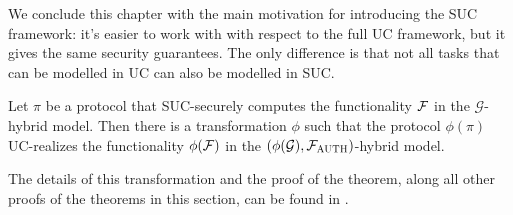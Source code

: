 We conclude this chapter with the main motivation for introducing the SUC framework: it's easier to work with with respect to the full UC framework, but it gives the same security guarantees. The only difference is that not all tasks that can be modelled in UC can also be modelled in SUC.

\begin{theorem}
    Let $\pi$ be a protocol that SUC-securely computes the functionality $\mathcal{F}$ in the $\mathcal G$-hybrid model. Then there is a transformation $\phi$ such that the protocol $\phi(\pi)$ UC-realizes the functionality $\phi(\mathcal{F})$ in the $(\phi(\mathcal G), \mathcal{F}_{\textsc{AUTH}})$-hybrid model.
\end{theorem}

The details of this transformation and the proof of the theorem, along all other proofs of the theorems in this section, can be found in \cite{Canetti_SUC}.